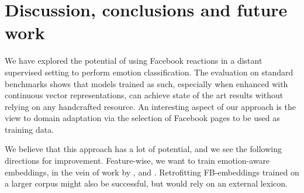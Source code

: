 \documentclass[11pt]{article}
\begin{document}
\section{Discussion, conclusions and future work}
\label{sec:conclusions}
We have explored the potential of using Facebook reactions in a distant supervised setting to perform emotion classification. The evaluation on standard benchmarks shows that models trained as such, especially when enhanced with continuous vector representations, can achieve state of the art results without relying on any handcrafted resource. An interesting aspect of our approach is the view to domain adaptation via the selection of Facebook pages to be used as training data.
 




We believe that this approach has a lot of potential, and we see the following directions for improvement. Feature-wise, we want to train emotion-aware embeddings, in the vein of work by , and \cite{iacobacci2015sensembed}. Retrofitting FB-embeddings trained on a larger corpus might also be successful, but would rely on an external lexicon. 
\end{document}
